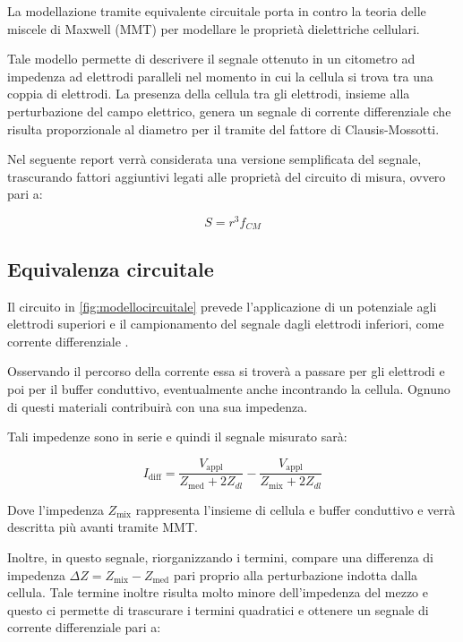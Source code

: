 La modellazione tramite equivalente circuitale porta in contro la teoria delle miscele di Maxwell (MMT) per modellare le proprietà dielettriche cellulari.

Tale modello permette di descrivere il segnale ottenuto in un citometro ad impedenza ad elettrodi paralleli nel momento in cui la cellula si trova tra una coppia di elettrodi. La presenza della cellula tra gli elettrodi, insieme alla perturbazione del campo elettrico, genera un segnale di corrente differenziale che risulta proporzionale al diametro per il tramite del fattore di Clausis-Mossotti.

Nel seguente report verrà considerata una versione semplificata del segnale, trascurando fattori aggiuntivi legati alle proprietà del circuito di misura, ovvero pari a:

\begin{equation}
	S=r^{3} f_{C M}
	\label{eq:signal}
\end{equation}

\subsection{Equivalenza circuitale}

Il circuito in \cref{fig:modellocircuitale} prevede l'applicazione di un potenziale agli elettrodi superiori e il campionamento del segnale dagli elettrodi inferiori, come corrente differenziale \cite{honradoSinglecellMicrofluidicImpedance2021}.

Osservando il percorso della corrente essa si troverà a passare per gli elettrodi e poi per il buffer conduttivo, eventualmente anche incontrando la cellula. Ognuno di questi materiali contribuirà con una sua impedenza.

Tali impedenze sono in serie e quindi il segnale misurato sarà:

\begin{equation}
	I_{\operatorname{d i f f}}=\frac{V_{\operatorname{a p p l}}}{Z_{\operatorname{m e d}}+2 Z_{d l}}-\frac{V_{\operatorname{a p p l}}}{Z_{\operatorname{m i x}}+2 Z_{d l}}
\end{equation}

Dove l'impedenza $Z_{\operatorname{m i x}}$ rappresenta l'insieme di cellula e buffer conduttivo e verrà descritta più avanti tramite MMT.

Inoltre, in questo segnale, riorganizzando i termini, compare una differenza di impedenza $\Delta Z=Z_{\operatorname{m i x}}-Z_{\operatorname{m e d}}$ pari proprio alla perturbazione indotta dalla cellula.  Tale termine inoltre risulta molto minore dell'impedenza del mezzo e questo ci permette di trascurare i termini quadratici e ottenere un segnale di corrente differenziale pari a:

